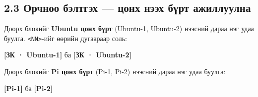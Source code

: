 \hypertarget{ux43eux440ux447ux43dux43eux43e-ux431ux44dux43bux442ux433ux44dux445-ux446ux43eux43dux445-ux43dux44dux44dux445-ux431ux4afux440ux442-ux430ux436ux438ux43bux43bux443ux443ux43bux43dux430}{%
\subsection{\texorpdfstring{2.3 Орчноо бэлтгэх --- \textbf{цонх нээх бүрт} ажиллуулна}{2.3 Орчноо бэлтгэх --- цонх нээх бүрт ажиллуулна}}\label{ux43eux440ux447ux43dux43eux43e-ux431ux44dux43bux442ux433ux44dux445-ux446ux43eux43dux445-ux43dux44dux44dux445-ux431ux4afux440ux442-ux430ux436ux438ux43bux43bux443ux443ux43bux43dux430}}

Доорх блокийг \textbf{Ubuntu цонх бүрт} (Ubuntu-1, Ubuntu-2) нээсний дараа нэг удаа буулга. \texttt{\textless{}NN\textgreater{}}-ийг өөрийн дугаараар соль:

\textbf{{[}ЗК · Ubuntu-1{]}} ба \textbf{{[}ЗК · Ubuntu-2{]}}

\begin{Shaded}
\begin{Highlighting}[]
\KeywordTok{\&\&} 
 \OperatorTok{\textless{}}\OperatorTok{\textgreater{}}
  \KeywordTok{|} \VariableTok{)}
  \KeywordTok{|} \VariableTok{)}
 \VariableTok{\}}
\end{Highlighting}
\end{Shaded}

Доорх блокийг \textbf{Pi цонх бүрт} (Pi-1, Pi-2) нээсний дараа нэг удаа буулга:

\textbf{{[}Pi-1{]}} ба \textbf{{[}Pi-2{]}}

\begin{Shaded}
\begin{Highlighting}[]
  \KeywordTok{|} \VariableTok{)}
  \KeywordTok{|} \VariableTok{)}
 
\end{Highlighting}
\end{Shaded}

